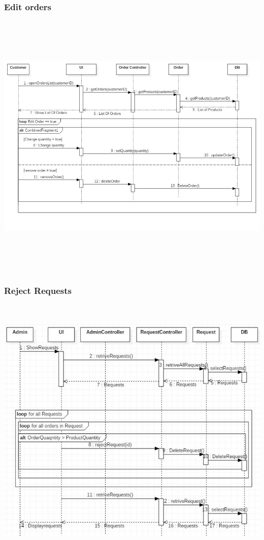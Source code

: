 \documentclass[12pt]{article}
\begin{document}
\subsubsection{ Edit orders }
\begin{center}
	\includegraphics[width=17cm,height=13cm]{./assets/sequencediagram/editorders.png}\\
\end{center}

\subsubsection{ Reject Requests }
\begin{center}
	\includegraphics[width=17cm,height=13cm]{./assets/sequencediagram/rejectrequests.png}\\
\end{center}
\end{document}
